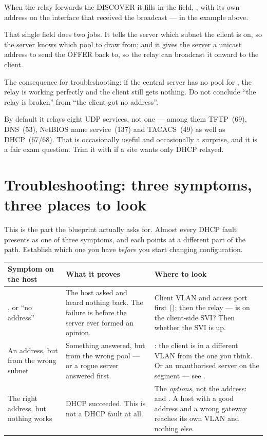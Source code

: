 \begin{conceptbox}
When the relay forwards the DISCOVER it fills in the 
field, , with its own address on the interface that received the
broadcast ---  in the example above.

That single field does two jobs. It tells the server which subnet the client is
on, so the server knows which pool to draw from; and it gives the server a
unicast address to send the OFFER back to, so the relay can broadcast it onward
to the client.

The consequence for troubleshooting: if the central server has no pool for
, the relay is working perfectly and the client still gets
nothing. Do not conclude ``the relay is broken'' from ``the client got no
address''.
\end{conceptbox}

\begin{examnote}
By default it relays eight UDP services, not one --- among them TFTP~(69),
DNS~(53), NetBIOS name service~(137) and TACACS~(49) as well as DHCP~(67/68).
That is occasionally useful and occasionally a surprise, and it is a fair exam
question. Trim it with  if a site wants only
DHCP relayed.
\end{examnote}

\section{Troubleshooting: three symptoms, three places to look}

This is the part the blueprint actually asks for. Almost every DHCP fault
presents as one of three symptoms, and each points at a different part of the
path. Establish which one you have \emph{before} you start changing
configuration.

\begin{longtable}{@{}L{3.3cm}L{5.5cm}L{6.4cm}@{}}
\toprule
{}
\textbf{Symptom on the host} & \textbf{What it proves} & \textbf{Where to look} \\
\midrule
\endhead
{}, or ``no address'' &
The host asked and heard nothing back. The failure is before the server ever
formed an opinion. &
Client VLAN and access port first (); then the relay ---
is  on the client-side SVI? Then whether the SVI is up. \\
An address, but from the wrong subnet &
Something answered, but from the wrong pool --- or a rogue server answered
first. &
: the client is in a different VLAN from the one you think. Or an
unauthorised server on the segment --- see . \\
The right address, but nothing works &
DHCP succeeded. This is not a DHCP fault at all. &
The \emph{options}, not the address:  and
. A host with a good address and a wrong gateway reaches its own
VLAN and nothing else. \\
\bottomrule
\end{longtable}

